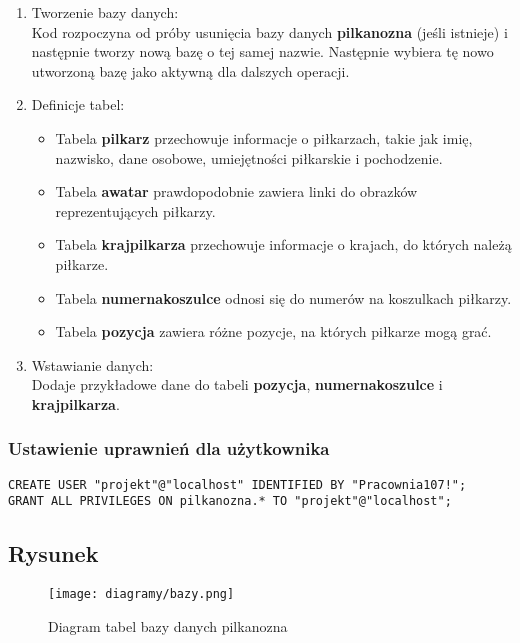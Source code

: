             \begin{enumerate}
                \item Tworzenie bazy danych:\\
                Kod rozpoczyna od próby usunięcia bazy danych \textbf{pilkanozna} (jeśli istnieje) i następnie tworzy nową bazę o tej samej nazwie.
                Następnie wybiera tę nowo utworzoną bazę jako aktywną dla dalszych operacji.
                \item  Definicje tabel:
                \begin{itemize}
                    \item Tabela \textbf{pilkarz} przechowuje informacje o piłkarzach, takie jak imię, nazwisko, dane osobowe, umiejętności piłkarskie i pochodzenie.
                    \item Tabela \textbf{awatar} prawdopodobnie zawiera linki do obrazków reprezentujących piłkarzy.
                    \item Tabela \textbf{krajpilkarza} przechowuje informacje o krajach, do których należą piłkarze.
                    \item Tabela \textbf{numernakoszulce} odnosi się do numerów na koszulkach piłkarzy.
                    \item Tabela \textbf{pozycja} zawiera różne pozycje, na których piłkarze mogą grać.
                \end{itemize}
                             
                \item Wstawianie danych:\\
                Dodaje przykładowe dane do tabeli \textbf{pozycja}, \textbf{numernakoszulce} i \textbf{krajpilkarza}.
            \end{enumerate}

        \subsubsection{Ustawienie uprawnień dla użytkownika}
        \begin{lstlisting}
CREATE USER "projekt"@"localhost" IDENTIFIED BY "Pracownia107!"; 
GRANT ALL PRIVILEGES ON pilkanozna.* TO "projekt"@"localhost";
        \end{lstlisting}

    \pagebreak
    \subsection{Rysunek}
        \begin{figure}[!htb]
            \centering
            \texttt{[image: diagramy/bazy.png]}
            \caption{Diagram tabel bazy danych pilkanozna}
        \end{figure}